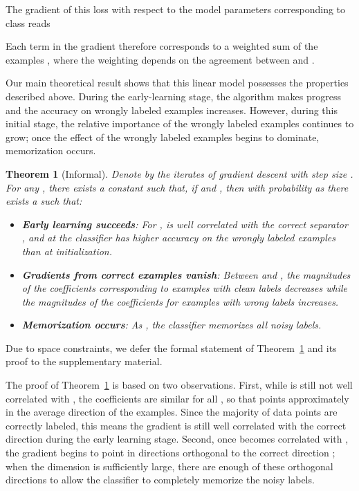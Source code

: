\documentclass{article}
\newtheorem{theorem}{Theorem}
\newcommand{\1}{\mathds{1}}
\begin{document}
The gradient of this loss with respect to the model parameters  corresponding to class  reads

Each term in the gradient therefore corresponds to a weighted sum of the examples , where the weighting depends on the agreement between  and .

Our main theoretical result shows that this linear model possesses the properties described above.
During the early-learning stage, the algorithm makes progress and the accuracy on wrongly labeled examples increases.
However, during this initial stage, the relative importance of the wrongly labeled examples continues to grow; once the effect of the wrongly labeled examples begins to dominate, memorization occurs.

\begin{theorem}[Informal]\label{thm:main}
Denote by  the iterates of gradient descent with step size .
For any , there exists a constant  such that, if 
and , then with probability  as  there exists a  such that:
\begin{itemize}
\item \textbf{Early learning succeeds}:  For ,  is well correlated with the correct separator , and at  the classifier has higher accuracy on the wrongly labeled examples than at initialization.
\item \textbf{Gradients from correct examples vanish}: Between  and , the magnitudes of the coefficients  corresponding to examples with clean labels decreases while the magnitudes of the coefficients for examples with wrong labels increases. 
\item \textbf{Memorization occurs}: As , the classifier  memorizes all noisy labels.
\end{itemize}
\end{theorem}
Due to space constraints, we defer the formal statement of Theorem~\ref{thm:main} and its proof to the supplementary material.

The proof of Theorem~\ref{thm:main} is based on two observations. First, while  is still not well correlated with , the coefficients  are similar for all , so that  points approximately in the average direction of the examples. Since the majority of data points are correctly labeled, this means the gradient is still well correlated with the correct direction during the early learning stage. Second, once  becomes correlated with , the gradient begins to point in directions orthogonal to the correct direction ; when the dimension is sufficiently large, there are enough of these orthogonal directions to allow the classifier to completely memorize the noisy labels. 
\end{document}
